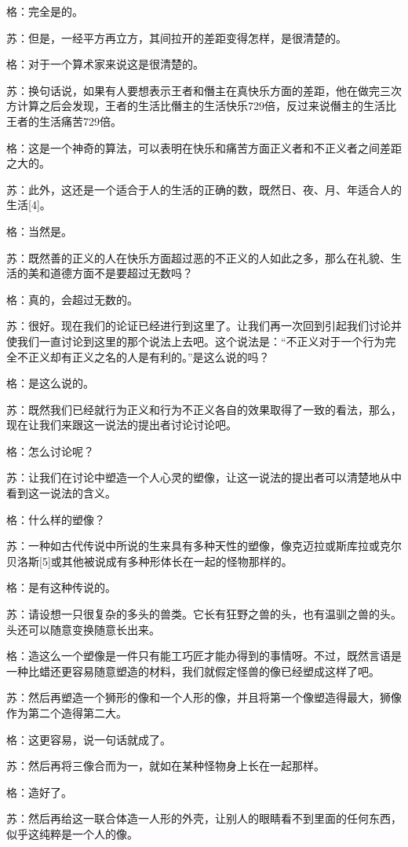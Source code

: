 \documentclass[12pt,oneside]{book}
\begin{document}
格：完全是的。

苏：但是，一经平方再立方，其间拉开的差距变得怎样，是很清楚的。

格：对于一个算术家来说这是很清楚的。

苏：换句话说，如果有人要想表示王者和僭主在真快乐方面的差距，他在做完三次方计算之后会发现，王者的生活比僭主的生活快乐729倍，反过来说僭主的生活比王者的生活痛苦729倍。

格：这是一个神奇的算法，可以表明在快乐和痛苦方面正义者和不正义者之间差距之大的。

苏：此外，这还是一个适合于人的生活的正确的数，既然日、夜、月、年适合人的生活[4]。

格：当然是。

苏：既然善的正义的人在快乐方面超过恶的不正义的人如此之多，那么在礼貌、生活的美和道德方面不是要超过无数吗？

格：真的，会超过无数的。

苏：很好。现在我们的论证已经进行到这里了。让我们再一次回到引起我们讨论并使我们一直讨论到这里的那个说法上去吧。这个说法是：“不正义对于一个行为完全不正义却有正义之名的人是有利的。”是这么说的吗？

格：是这么说的。

苏：既然我们已经就行为正义和行为不正义各自的效果取得了一致的看法，那么，现在让我们来跟这一说法的提出者讨论讨论吧。

格：怎么讨论呢？

苏：让我们在讨论中塑造一个人心灵的塑像，让这一说法的提出者可以清楚地从中看到这一说法的含义。

格：什么样的塑像？

苏：一种如古代传说中所说的生来具有多种天性的塑像，像克迈拉或斯库拉或克尔贝洛斯[5]或其他被说成有多种形体长在一起的怪物那样的。

格：是有这种传说的。

苏：请设想一只很复杂的多头的兽类。它长有狂野之兽的头，也有温驯之兽的头。头还可以随意变换随意长出来。

格：造这么一个塑像是一件只有能工巧匠才能办得到的事情呀。不过，既然言语是一种比蜡还更容易随意塑造的材料，我们就假定怪兽的像已经塑成这样了吧。

苏：然后再塑造一个狮形的像和一个人形的像，并且将第一个像塑造得最大，狮像作为第二个造得第二大。

格：这更容易，说一句话就成了。

苏：然后再将三像合而为一，就如在某种怪物身上长在一起那样。

格：造好了。

苏：然后再给这一联合体造一人形的外壳，让别人的眼睛看不到里面的任何东西，似乎这纯粹是一个人的像。
\end{document}
